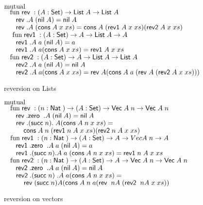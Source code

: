 \begin{figure}
$\mathrm{mutual}\; $  \\
$ \hspace*{3mm} \mathrm{fun}\; \mathsf{rev}\; : ( A : \mathsf{Set} ) \rightarrow{\mathsf{List}\;A \rightarrow\mathsf{List}\;A} $ \\
$ \spc \spc \rev .A \; (\nil A ) = \nil A$\\
$ \spc \spc \rev .A \; (\cons A \;x  \; xs) = \cons A \; (\reva A \; x \; xs) (\revb A \; x \; xs)$\\
$\ \hspace*{3mm} \mathrm{fun}\; \mathsf{rev1}\; : ( A  : \mathsf{Set} ) \rightarrow{A  \rightarrow\mathsf{List}\;A \rightarrow A}$\\
$ \spc \spc \reva .A \; a \; (\nil A ) = a$ \\
$\spc \spc \reva .A \; a (\cons A \; x \; xs) = \reva A \; x \; xs$\\
$\hspace*{3mm} \mathrm{fun}\; \mathsf{rev2}\; : ( A : \mathsf{Set} ) \rightarrow{ A \rightarrow\mathsf{List}\;A \rightarrow\mathsf{List}\;A} $\\
$\spc \spc \revb .A \; a \; (\nil A ) = \nil A $\\
$\spc \spc \revb .A \; a (\cons A\;  x \; xs) = \rev A (\cons A \; a \; (\rev A \; (\revb A \; x \; xs)))$

\caption{reversion on Lists}  
\end{figure}
\begin{figure} 
$\mathrm{mutual}\; $ \\
$\hspace*{3mm} \mathrm{fun}\; \mathsf{rev}\; : ( n : \mathsf{Nat}\;  ) \rightarrow{( A : \mathsf{Set}) \rightarrow{\mathsf{Vec}\;A \; n \rightarrow\mathsf{Vec}\;A \; n}}$\\
$\spc \spc \rev .\zero \; .A  \; (\nil A) = \nil A $\\
$\spc \spc \rev .(\suc n) .\; A (\cons A \; n \; x \; xs) = $\\
$\spcx \cons A \; n \; (\reva n \; A \; x \; xs) (\revb n \; A \; x \; xs) $ \\
$\hspace*{3mm} \mathrm{fun}\; \mathsf{rev1}\; : ( n : \mathsf{Nat}\; ) \rightarrow( A : \mathsf{Set} ) \rightarrow{A \rightarrow Vec A \; n \rightarrow A}$\\
$\spc \spc \reva .\zero  \; .A \; a \; (\nil A) = a $\\
$\spc \spc \reva .(\suc n) .A \; a \; (\cons A \; n \; x \; xs) = \reva n \; A \; x \; xs $\\
$\hspace*{3mm} \mathrm{fun}\; \mathsf{rev2}\; : ( n : \mathsf{Nat}\; ) \rightarrow{( A : \mathsf{Set}) \rightarrow{A \rightarrow\mathsf{Vec}\;A \; n \rightarrow\mathsf{Vec}\;A \; n}}$\\
$ \spc \spc \revb .\zero \; .A  \; a \; (\nil A) = \nil A $\\
$ \spc \spc \revb .(\suc n) \; .A \; a (\cons A \; n \; x \; xs) = $\\
$ \spcx \rev (\suc n) A (\cons A \; n \; a (\rev \; n A \; (\revb \; n A \; x \; xs))$
\caption{reversion on vectors}  
\end{figure}  

